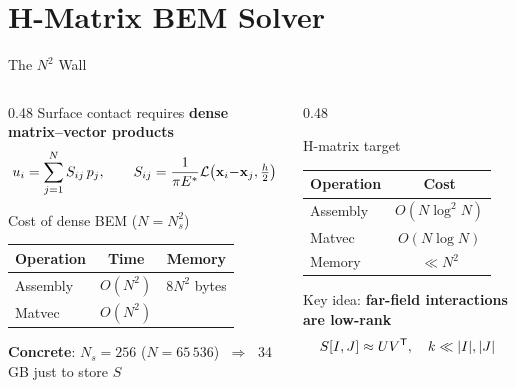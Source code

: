 \section{H-Matrix BEM Solver}

\begin{frame}{The $N^2$ Wall}
\begin{columns}[T]
\begin{column}{0.48\textwidth}
  Surface contact requires \textbf{dense matrix–vector products}
  \[
    u_i = \sum_{j=1}^{N} S_{ij}\,p_j,
    \qquad S_{ij} = \frac{1}{\pi E^*}
      \mathcal{L}\!\left(\mathbf{x}_i{-}\mathbf{x}_j,\tfrac{h}{2}\right)
  \]
  \begin{block}{Cost of dense BEM ($N = N_s^2$)}
    \begin{tabular}{lcc}
      \toprule
      Operation & Time & Memory \\
      \midrule
      Assembly  & $O(N^2)$ & $8N^2$ bytes \\
      Matvec    & $O(N^2)$ & \\
      \bottomrule
    \end{tabular}
  \end{block}
  \vspace{0.4em}
  \textbf{Concrete}: $N_s=256$ ($N=65\,536$)
  $\;\Rightarrow\;$ \alert{34\,GB} just to store $S$
\end{column}
\begin{column}{0.48\textwidth}
  \begin{block}{H-matrix target}
    \begin{tabular}{lc}
      \toprule
      Operation & Cost \\
      \midrule
      Assembly  & $O(N\log^2 N)$ \\
      Matvec    & $O(N\log N)$ \\
      Memory    & $\ll N^2$ \\
      \bottomrule
    \end{tabular}
  \end{block}
  \vspace{0.4em}
  Key idea: \textbf{far-field interactions are low-rank}
  \[
    S[I,J] \approx UV^{\mathsf{T}}, \quad k \ll |I|,|J|
  \]
\end{column}
\end{columns}
\end{frame}

